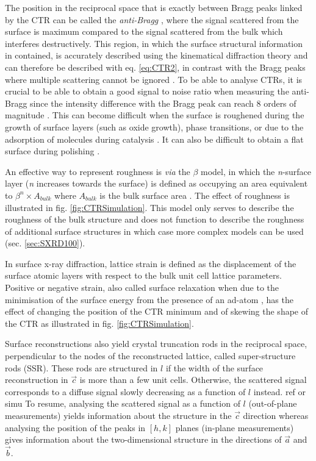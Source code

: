 The position in the reciprocal space that is exactly between Bragg peaks linked by the CTR can be called the \textit{anti-Bragg} \parencite{Robinson1991}, where the signal scattered from the surface is maximum compared to the signal scattered from the bulk which interferes destructively.
This region, in which the surface structural information in contained, is accurately described using the kinematical diffraction theory and can therefore be described with eq. \ref{eq:CTR2}, in contrast with the Bragg peaks where multiple scattering cannot be ignored \parencite{Kaganer2007}.
To be able to analyse CTRs, it is crucial to be able to obtain a good signal to noise ratio when measuring the anti-Bragg since the intensity difference with the Bragg peak can reach 8 orders of magnitude \parencite{Fadenberger2010}.
This can become difficult when the surface is roughened during the growth of surface layers (such as oxide growth), phase transitions, or due to the adsorption of molecules during catalysis \parencite{Zhdanov1997, Zhdanov1998}.
It can also be difficult to obtain a flat surface during polishing \parencite{Musket1982}.

An effective way to represent roughness is \textit{via} the $\beta$ model, in which the \textit{n}-surface layer (\textit{n} increases towards the surface) is defined as occupying an area equivalent to $\beta^n \times A_{bulk}$ where $A_{bulk}$ is the bulk surface area \parencite{Robinson1986}.
The effect of roughness is illustrated in fig. \ref{fig:CTRSimulation}.
This model only serves to describe the roughness of the bulk structure and does not function to describe the roughness of additional surface structures in which case more complex models can be used (sec. \ref{sec:SXRD100}).

In surface x-ray diffraction, lattice strain is defined as the displacement of the surface atomic layers with respect to the bulk unit cell lattice parameters.
Positive or negative strain, also called surface relaxation when due to the minimisation of the surface energy from the presence of an ad-atom \parencite{Gupta1981}, has the effect of changing the position of the CTR minimum and of skewing the shape of the CTR as illustrated in fig. \ref{fig:CTRSimulation}.

Surface reconstructions also yield crystal truncation rods in the reciprocal space, perpendicular to the nodes of the reconstructed lattice, called super-structure rods (SSR).
These rods are structured in $l$ if the width of the surface reconstruction in $\vec{c}$ is more than a few unit cells.
Otherwise, the scattered signal corresponds to a diffuse signal slowly decreasing as a function of $l$ instead.
\textcolor{Important}{ref or simu}
To resume, analysing the scattered signal as a function of $l$ (out-of-plane measurements) yields information about the structure in the $\vec{c}$ direction whereas analysing the position of the peaks in $[h, k]$ planes (in-plane measurements) gives information about the two-dimensional structure in the directions of $\vec{a}$ and $\vec{b}$.


